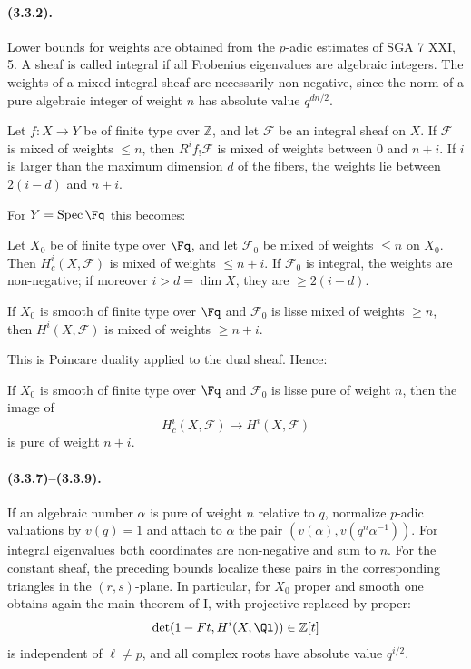 \paragraph{(3.3.2).}
Lower bounds for weights are obtained from the $p$-adic estimates of SGA 7 XXI, 5. A sheaf is called integral if all Frobenius eigenvalues are algebraic integers. The weights of a mixed integral sheaf are necessarily non-negative, since the norm of a pure algebraic integer of weight $n$ has absolute value $q^{dn/2}$.

\begin{corollary}[3.3.3]
Let $f:X\to Y$ be of finite type over $\mathbb Z$, and let $\mathcal F$ be an integral sheaf on $X$. If $\mathcal F$ is mixed of weights $\le n$, then $R^if_{!}\mathcal F$ is mixed of weights between $0$ and $n+i$. If $i$ is larger than the maximum dimension $d$ of the fibers, the weights lie between $2(i-d)$ and $n+i$.
\end{corollary}

For $Y=\operatorname{Spec}\Fq$ this becomes:

\begin{corollary}[3.3.4]
Let $X_0$ be of finite type over $\Fq$, and let $\mathcal F_0$ be mixed of weights $\le n$ on $X_0$. Then $H^i_c(X,\mathcal F)$ is mixed of weights $\le n+i$. If $\mathcal F_0$ is integral, the weights are non-negative; if moreover $i>d=\dim X$, they are $\ge2(i-d)$.
\end{corollary}

\begin{corollary}[3.3.5]
If $X_0$ is smooth of finite type over $\Fq$ and $\mathcal F_0$ is lisse mixed of weights $\ge n$, then $H^i(X,\mathcal F)$ is mixed of weights $\ge n+i$.
\end{corollary}
This is Poincare duality applied to the dual sheaf. Hence:

\begin{corollary}[3.3.6]
If $X_0$ is smooth of finite type over $\Fq$ and $\mathcal F_0$ is lisse pure of weight $n$, then the image of
\[
H^i_c(X,\mathcal F)\longrightarrow H^i(X,\mathcal F)
\]
is pure of weight $n+i$.
\end{corollary}

\paragraph{(3.3.7)--(3.3.9).}
If an algebraic number $\alpha$ is pure of weight $n$ relative to $q$, normalize $p$-adic valuations by $v(q)=1$ and attach to $\alpha$ the pair $(v(\alpha),v(q^n\alpha^{-1}))$. For integral eigenvalues both coordinates are non-negative and sum to $n$. For the constant sheaf, the preceding bounds localize these pairs in the corresponding triangles in the $(r,s)$-plane. In particular, for $X_0$ proper and smooth one obtains again the main theorem of I, with projective replaced by proper:
\[
\det(1-Ft,H^i(X,\Ql))\in\mathbb Z[t]
\]
is independent of $\ell\ne p$, and all complex roots have absolute value $q^{i/2}$.

